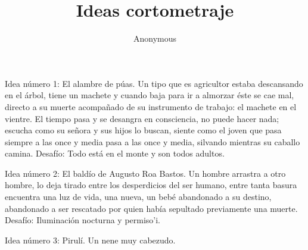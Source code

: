 \documentclass{report}
\title{Ideas cortometraje}
\author{Anonymous}
\begin{document}
\maketitle

Idea número 1: El alambre de púas.
Un tipo que es agricultor estaba descansando en el árbol, tiene un machete y cuando baja para ir a almorzar éste se cae mal, directo a su muerte 
acompañado de su instrumento de trabajo: el machete en el vientre.
El tiempo pasa y se desangra en consciencia, no puede hacer nada; escucha como su señora y sus hijos lo buscan, siente como el joven que pasa 
siempre a las once y media pasa a las once y media, silvando mientras su caballo camina.
Desafío: Todo está en el monte y son todos adultos.

Idea número 2: El baldío de Augusto Roa Bastos.
Un hombre arrastra a otro hombre, lo deja tirado entre los desperdicios del ser humano, entre tanta basura encuentra una luz de vida, una nueva,
un bebé abandonado a su destino, abandonado a ser rescatado por quien había sepultado previamente una muerte.
Desafío: Iluminación nocturna y permiso'i.

Idea número 3: Pirulí.
Un nene muy cabezudo.
\end{document}
